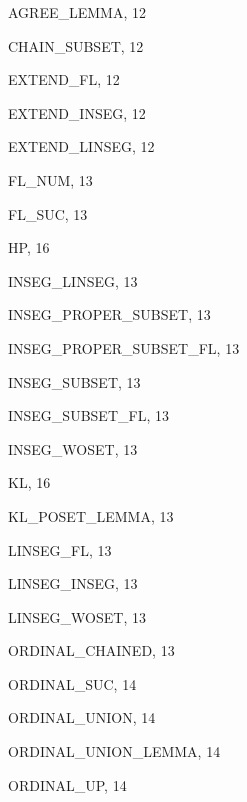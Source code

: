 \begin{theindex}

  \item {\ptt AGREE\_LEMMA}, 12

  \indexspace

  \item {\ptt CHAIN\_SUBSET}, 12

  \indexspace

  \item {\ptt EXTEND\_FL}, 12
  \item {\ptt EXTEND\_INSEG}, 12
  \item {\ptt EXTEND\_LINSEG}, 12

  \indexspace

  \item {\ptt FL\_NUM}, 13
  \item {\ptt FL\_SUC}, 13

  \indexspace

  \item {\ptt HP}, 16

  \indexspace

  \item {\ptt INSEG\_LINSEG}, 13
  \item {\ptt INSEG\_PROPER\_SUBSET}, 13
  \item {\ptt INSEG\_PROPER\_SUBSET\_FL}, 13
  \item {\ptt INSEG\_SUBSET}, 13
  \item {\ptt INSEG\_SUBSET\_FL}, 13
  \item {\ptt INSEG\_WOSET}, 13

  \indexspace

  \item {\ptt KL}, 16
  \item {\ptt KL\_POSET\_LEMMA}, 13

  \indexspace

  \item {\ptt LINSEG\_FL}, 13
  \item {\ptt LINSEG\_INSEG}, 13
  \item {\ptt LINSEG\_WOSET}, 13

  \indexspace

  \item {\ptt ORDINAL\_CHAINED}, 13
  \item {\ptt ORDINAL\_SUC}, 14
  \item {\ptt ORDINAL\_UNION}, 14
  \item {\ptt ORDINAL\_UNION\_LEMMA}, 14
  \item {\ptt ORDINAL\_UP}, 14


\end{theindex}
